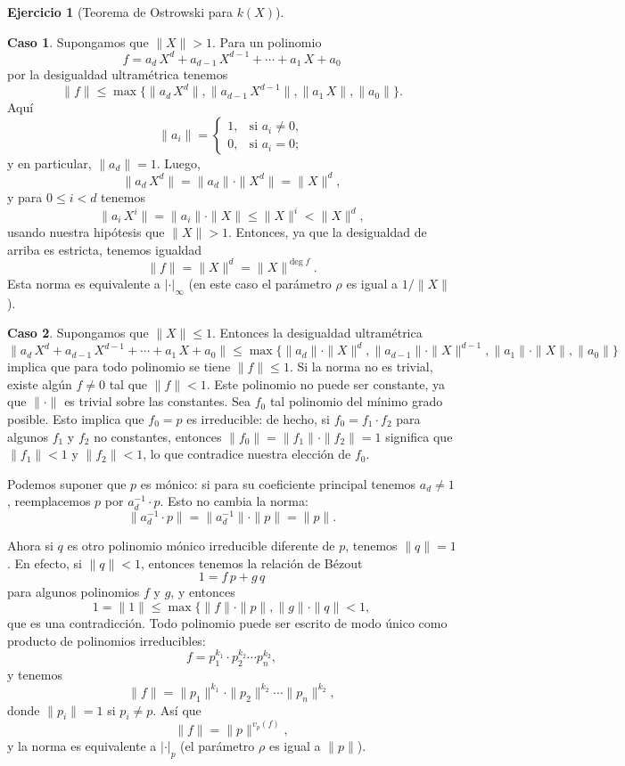 \documentclass{article}
\numberwithin{equation}{section}
\theoremstyle{definition}
\newtheorem{ejerc}{Ejercicio}
\begin{document}
\begin{ejerc}[Teorema de Ostrowski para $k (X)$]
\begin{solucion}
    \vspace{1em}

    \noindent\textbf{Caso 1}. Supongamos que $\|X\| > 1$. Para un polinomio
    $$f = a_d\,X^d + a_{d-1}\,X^{d-1} + \cdots + a_1\,X + a_0$$
    por la desigualdad ultramétrica tenemos
    $$\|f\| \le \max \{ \|a_d\,X^d\|, \|a_{d-1}\,X^{d-1}\|, \|a_1\,X\|, \|a_0\| \}.$$
    Aquí
    $$\|a_i\| = \begin{cases}
      1, & \text{si } a_i \ne 0,\\
      0, & \text{si } a_i = 0;
    \end{cases}$$
    y en particular, $\|a_d\| = 1$. Luego,
    $$\|a_d\,X^d\| = \|a_d\|\cdot \|X^d\| = \|X\|^d,$$
    y para $0 \le i < d$ tenemos
    $$\|a_i\,X^i\| = \|a_i\|\cdot \|X\| \le \|X\|^i < \|X\|^d,$$
    usando nuestra hipótesis que $\|X\| > 1$. Entonces, ya que la desigualdad de
    arriba es estricta, tenemos igualdad
    $$\|f\| = \|X\|^d = \|X\|^{\deg f}.$$
    Esta norma es equivalente a $|\cdot|_\infty$ (en este caso el parámetro
    $\rho$ es igual a $1/\|X\|$).

    \vspace{1em}

    \noindent\textbf{Caso 2}. Supongamos que $\|X\| \le 1$. Entonces la
    desigualdad ultramétrica
    \[ \|a_d\,X^d + a_{d-1}\,X^{d-1} + \cdots + a_1\,X + a_0\| \le
       \max \{ \|a_d\|\cdot \|X\|^d, \|a_{d-1}\|\cdot\|X\|^{d-1}, \|a_1\|\cdot\|X\|, \|a_0\| \} \]
    implica que para todo polinomio se tiene $\|f\| \le 1$.  Si la norma
    no es trivial, existe algún $f \ne 0$ tal que $\|f\| < 1$. Este polinomio
    no puede ser constante, ya que $\|\cdot\|$ es trivial sobre
    las constantes. Sea $f_0$ tal polinomio del mínimo grado posible.
    Esto implica que $f_0 = p$ es irreducible: de hecho, si
    $f_0 = f_1 \cdot f_2$ para algunos $f_1$ y $f_2$ no constantes, entonces
    $\|f_0\| = \|f_1\|\cdot \|f_2\| = 1$ significa que $\|f_1\| < 1$ y
    $\|f_2\| < 1$, lo que contradice nuestra elección de $f_0$.

    Podemos suponer que $p$ es mónico: si para su coeficiente principal tenemos
    $a_d \ne 1$, reemplacemos $p$ por $a_d^{-1}\cdot p$. Esto no cambia
    la norma:
    $$\|a_d^{-1}\cdot p\| = \|a_d^{-1}\|\cdot \|p\| = \|p\|.$$

    Ahora si $q$ es otro polinomio mónico irreducible diferente de $p$, tenemos
    $\|q\| = 1$. En efecto, si $\|q\| < 1$, entonces tenemos la relación
    de Bézout
    $$1 = f\,p + g\,q$$
    para algunos polinomios $f$ y $g$, y entonces
    $$1 = \|1\| \le \max \{ \|f\|\cdot \|p\|, \|g\|\cdot \|q\| < 1,$$
    que es una contradicción. Todo polinomio puede ser escrito de modo único
    como producto de polinomios irreducibles:
    $$f = p_1^{k_1} \cdot p_2^{k_2} \cdots p_n^{k_2},$$
    y tenemos
    $$\|f\| = \|p_1\|^{k_1} \cdot \|p_2\|^{k_2} \cdots \|p_n\|^{k_2},$$
    donde $\|p_i\| = 1$ si $p_i \ne p$. Así que
    $$\|f\| = \|p\|^{v_p (f)},$$
    y la norma es equivalente a $|\cdot|_p$ (el parámetro $\rho$ es igual
    a $\|p\|$).
  \end{solucion}\fi
\end{ejerc}
\end{document}
